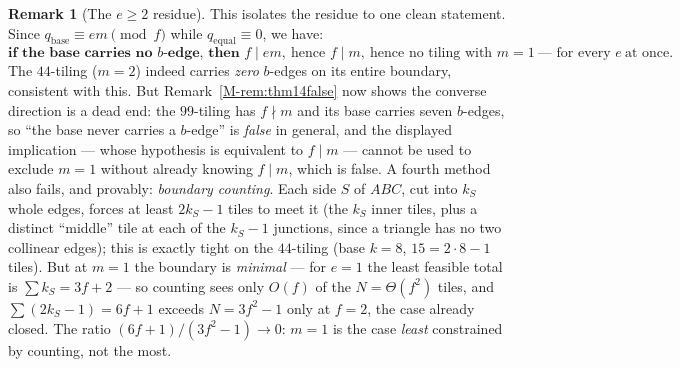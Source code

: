 \documentclass[11pt,reqno]{amsart}
\theoremstyle{plain}
\theoremstyle{definition}
\newtheorem{remark}[theorem]{Remark}
\begin{document}
\begin{remark}[The $e\ge2$ residue]
This isolates the residue to one clean statement. Since $q_{\mathrm{base}}\equiv em \pmod f$ while
$q_{\mathrm{equal}}\equiv0$, we have:
\[
\textbf{if the base carries no } b\textbf{-edge, then } f\mid em,\ \text{hence } f\mid m,
\ \text{hence no tiling with } m=1 \ \text{--- for every } e\ \text{at once.}
\]
The $44$-tiling ($m=2$) indeed carries \emph{zero} $b$-edges on its entire boundary, consistent with
this. But Remark~\ref{M-rem:thm14false} now shows the converse direction is a dead end: the
$99$-tiling has $f\nmid m$ and its base carries seven $b$-edges, so ``the base never carries a
$b$-edge'' is \emph{false} in general, and the displayed implication --- whose hypothesis is
equivalent to $f\mid m$ --- cannot be used to exclude $m=1$ without already knowing $f\mid m$, which
is false. A fourth method also fails, and provably: \emph{boundary counting}. Each side $S$ of $ABC$, cut into
$k_S$ whole edges, forces at least $2k_S-1$ tiles to meet it (the $k_S$ inner tiles, plus a distinct
``middle'' tile at each of the $k_S-1$ junctions, since a triangle has no two collinear edges); this
is exactly tight on the $44$-tiling (base $k=8$, $15=2\cdot8-1$ tiles). But at $m=1$ the boundary is
\emph{minimal} --- for $e=1$ the least feasible total is $\sum k_S=3f+2$ --- so counting sees only
$O(f)$ of the $N=\Theta(f^2)$ tiles, and $\sum(2k_S-1)=6f+1$ exceeds $N=3f^2-1$ only at $f=2$, the
case already closed. The ratio $(6f+1)/(3f^2-1)\to0$: $m=1$ is the case \emph{least} constrained by
counting, not the most.


\end{remark}
\end{document}
